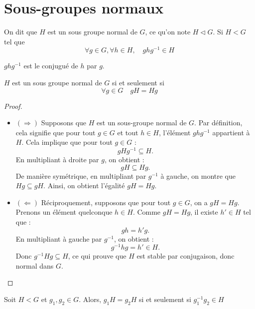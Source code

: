 \section{Sous-groupes normaux}
\begin{definition}
    On dit que $H$ est un sous groupe normal de $G$, ce qu'on note $H\triangleleft G$. Si $H<G$ tel que
    \[
    \forall g \in G, \forall h \in H, \quad ghg^{-1}\in H
    \]
\end{definition}

\begin{remarque}
    $ghg^{-1}$ est le conjugué de $h$ par $g$.
\end{remarque}

\begin{proposition}
    $H$ est un sous groupe normal de $G$ si et seulement si \\
    \[\forall g\in G \quad gH=Hg\]
\end{proposition}

\begin{proof}
    \begin{itemize}
    \item $(\Rightarrow)$ Supposons que $H$ est un sous-groupe normal de $G$.  
    Par définition, cela signifie que pour tout $g \in G$ et tout $h \in H$, l'élément $ghg^{-1}$ appartient à $H$.  
    Cela implique que pour tout $g \in G$ :
    \[
    gH g^{-1} \subseteq H.
    \]
    En multipliant à droite par $g$, on obtient :
    \[
    gH \subseteq Hg.
    \]
    De manière symétrique, en multipliant par $g^{-1}$ à gauche, on montre que $Hg \subseteq gH$.  
    Ainsi, on obtient l'égalité $gH = Hg$.

    \item $(\Leftarrow)$ Réciproquement, supposons que pour tout $g \in G$, on a $gH = Hg$.  
    Prenons un élément quelconque $h \in H$.  
    Comme $gH = Hg$, il existe $h' \in H$ tel que :
    \[
    gh = h' g.
    \]
    En multipliant à gauche par $g^{-1}$, on obtient :
    \[
    g^{-1} h g = h' \in H.
    \]
    Donc $g^{-1} H g \subseteq H$, ce qui prouve que $H$ est stable par conjugaison, donc normal dans $G$.  
\end{itemize}

\end{proof}

\begin{lemme}
Soit $H<G$ et $g_1,g_2\in G$. Alors, $g_1H=g_2H$ si et seulement si $g_1^{-1}g_2\in H$
\end{lemme}


